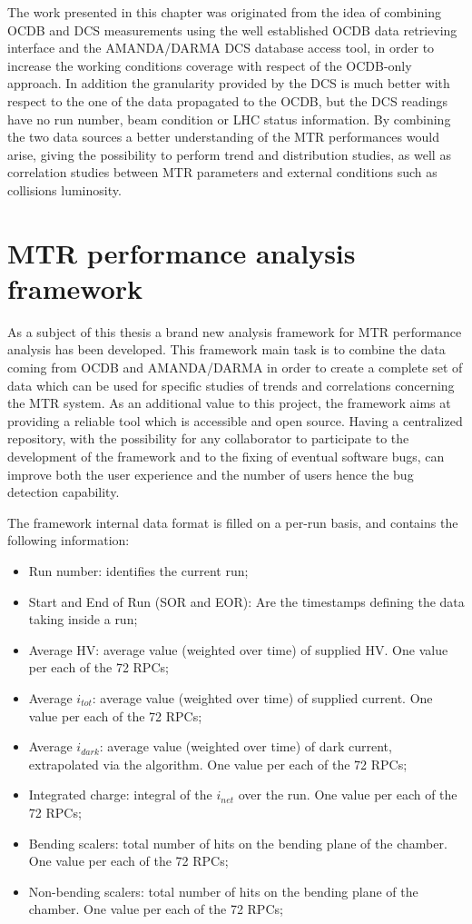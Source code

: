 The work presented in this chapter was originated from the idea of combining OCDB and DCS measurements using the well established OCDB data retrieving interface and the AMANDA/DARMA DCS database access tool, in order to increase the working conditions coverage with respect of the OCDB-only approach.
In addition the granularity provided by the DCS is much better with respect to the one of the data propagated to the OCDB, but the DCS readings have no run number, beam condition or LHC status information.
By combining the two data sources a better understanding of the MTR performances would arise, giving the possibility to perform trend and distribution studies, as well as correlation studies between MTR parameters and external conditions such as collisions luminosity.

\section{MTR performance analysis framework}
As a subject of this thesis a brand new analysis framework for MTR performance analysis has been developed.
This framework main task is to combine the data coming from OCDB and AMANDA/DARMA in order to create a complete set of data which can be used for specific studies of trends and correlations concerning the MTR system.
As an additional value to this project, the framework aims at providing a reliable tool which is accessible and open source.
Having a centralized repository, with the possibility for any collaborator to participate to the development of the framework and to the fixing of eventual software bugs, can improve both the user experience and the number of users hence the bug detection capability.

The framework internal data format is filled on a per-run basis, and contains the following information:
\begin{itemize}
\item Run number: identifies the current run;
\item Start and End of Run (SOR and EOR): Are the timestamps defining the data taking inside a run;
\item Average HV: average value (weighted over time) of supplied HV. One value per each of the 72 RPCs;
\item Average $i_{tot}$: average value (weighted over time) of supplied current.  One value per each of the 72 RPCs;
\item Average $i_{dark}$: average value (weighted over time) of dark current, extrapolated via the algorithm.  One value per each of the 72 RPCs;
\item Integrated charge: integral of the $i_{net}$ over the run.  One value per each of the 72 RPCs;
\item Bending scalers: total number of hits on the bending plane of the chamber.  One value per each of the 72 RPCs;
\item Non-bending scalers: total number of hits on the bending plane of the chamber.  One value per each of the 72 RPCs;
\end{itemize}

